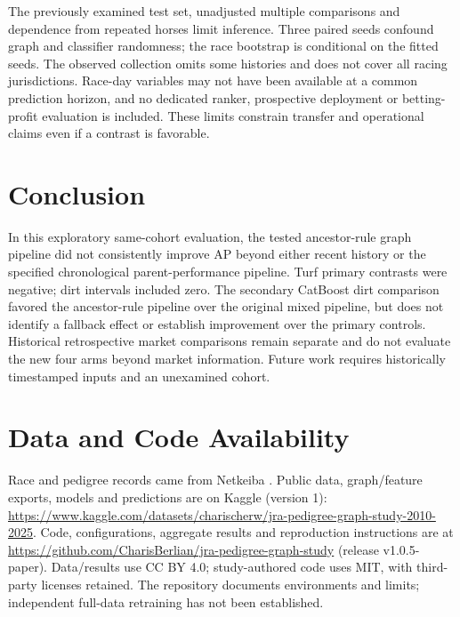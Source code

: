The previously examined test set, unadjusted multiple comparisons and dependence from repeated horses limit inference. Three paired seeds confound graph and classifier randomness; the race bootstrap is conditional on the fitted seeds. The observed collection omits some histories and does not cover all racing jurisdictions. Race-day variables may not have been available at a common prediction horizon, and no dedicated ranker, prospective deployment or betting-profit evaluation is included. These limits constrain transfer and operational claims even if a contrast is favorable.

\section{Conclusion}
In this exploratory same-cohort evaluation, the tested ancestor-rule graph pipeline did not consistently improve AP beyond either recent history or the specified chronological parent-performance pipeline. Turf primary contrasts were negative; dirt intervals included zero. The secondary CatBoost dirt comparison favored the ancestor-rule pipeline over the original mixed pipeline, but does not identify a fallback effect or establish improvement over the primary controls. Historical retrospective market comparisons remain separate and do not evaluate the new four arms beyond market information. Future work requires historically timestamped inputs and an unexamined cohort.

\section*{Data and Code Availability}
Race and pedigree records came from Netkeiba \cite{netkeibaRace,netkeibaDb}. Public data, graph/feature exports, models and predictions are on Kaggle (version 1): \url{https://www.kaggle.com/datasets/charischerw/jra-pedigree-graph-study-2010-2025}. Code, configurations, aggregate results and reproduction instructions are at \url{https://github.com/CharisBerlian/jra-pedigree-graph-study} (release v1.0.5-paper). Data/results use CC BY 4.0; study-authored code uses MIT, with third-party licenses retained. The repository documents environments and limits; independent full-data retraining has not been established.
